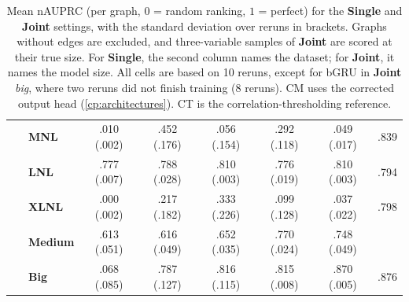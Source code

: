 \begin{table}[ht]
\begin{tabular}{l|lccccc|c}
        \rowcolor[HTML]{fff8e6}~ & \textbf{MNL} & .010 (.002) & .452 (.176) & .056 (.154) & .292 (.118) & .049 (.017) & .839 \\
        \rowcolor[HTML]{fff8e6}~ & \textbf{LNL} & .777 (.007) & .788 (.028) & .810 (.003) & .776 (.019) & .810 (.003) & .794 \\
        \rowcolor[HTML]{fff8e6}\multirow{-6}{*}{\rotatebox[origin=c]{90}{\textbf{Single}}} & \textbf{XLNL} & .000 (.002) & .217 (.182) & .333 (.226) & .099 (.128) & .037 (.022) & .798 \\
        \midrule\midrule
        \rowcolor[HTML]{fff8e6}~ & \textbf{Medium} & .613 (.051) & .616 (.049) & .652 (.035) & .770 (.024) & .748 (.049) & \\
        \rowcolor[HTML]{fff8e6}\multirow{-2}{*}{\rotatebox[origin=c]{90}{\textbf{Joint}}} & \textbf{Big} & .068 (.085) & .787 (.127) & .816 (.115) & .815 (.008) & .870 (.005) & \multirow{-2}{*}{.876} \\
    \bottomrule
    \end{tabular}
    \caption{Mean nAUPRC (per graph, $0$ = random ranking, $1$ = perfect) for the \textbf{Single} and \textbf{Joint} settings, with the standard deviation over reruns in brackets. Graphs without edges are excluded, and three-variable samples of \textbf{Joint} are scored at their true size. For \textbf{Single}, the second column names the dataset; for \textbf{Joint}, it names the model size. All cells are based on 10 reruns, except for bGRU in \textbf{Joint} \emph{big}, where two reruns did not finish training (8 reruns). CM uses the corrected output head (\cref{cp:architectures}). CT is the correlation-thresholding reference.}
\label{tab:cp:synthetic-1}
\end{table}
